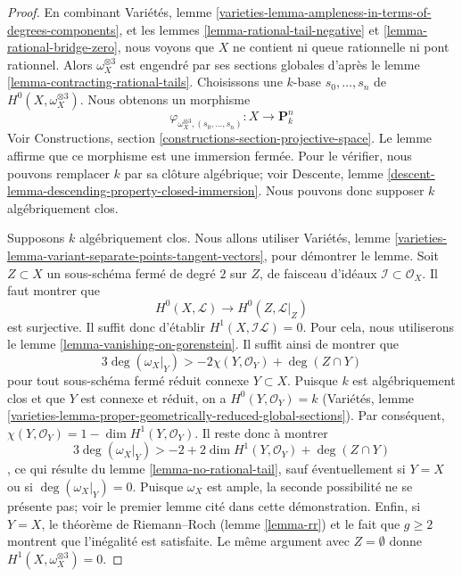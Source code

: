 \begin{proof}
En combinant Variétés, lemme \ref{varieties-lemma-ampleness-in-terms-of-degrees-components}, et les lemmes \ref{lemma-rational-tail-negative} et \ref{lemma-rational-bridge-zero}, nous voyons que $X$ ne contient ni queue rationnelle ni pont rationnel. Alors $\omega_X^{\otimes 3}$ est engendré par ses sections globales d'après le lemme \ref{lemma-contracting-rational-tails}. Choisissons une $k$-base $s_0, \ldots, s_n$ de $H^0(X, \omega_X^{\otimes 3})$. Nous obtenons un morphisme $$
\varphi_{\omega_X^{\otimes 3}, (s_0, \ldots, s_n)} :
X \longrightarrow \mathbf{P}^n_k
$$ Voir Constructions, section \ref{constructions-section-projective-space}. Le lemme affirme que ce morphisme est une immersion fermée. Pour le vérifier, nous pouvons remplacer $k$ par sa clôture algébrique; voir Descente, lemme \ref{descent-lemma-descending-property-closed-immersion}. Nous pouvons donc supposer $k$ algébriquement clos.

\medskip\noindent
Supposons $k$ algébriquement clos. Nous allons utiliser Variétés, lemme \ref{varieties-lemma-variant-separate-points-tangent-vectors}, pour démontrer le lemme. Soit $Z \subset X$ un sous-schéma fermé de degré $2$ sur $Z$, de faisceau d'idéaux $\mathcal{I} \subset \mathcal{O}_X$. Il faut montrer que $$
H^0(X, \mathcal{L}) \to H^0(Z, \mathcal{L}|_Z)
$$ est surjective. Il suffit donc d'établir $H^1(X, \mathcal{I}\mathcal{L}) = 0$. Pour cela, nous utiliserons le lemme \ref{lemma-vanishing-on-gorenstein}. Il suffit ainsi de montrer que $$
3\deg(\omega_X|_Y) > -2\chi(Y, \mathcal{O}_Y) + \deg(Z \cap Y)
$$ pour tout sous-schéma fermé réduit connexe $Y \subset X$. Puisque $k$ est algébriquement clos et que $Y$ est connexe et réduit, on a $H^0(Y, \mathcal{O}_Y) = k$ (Variétés, lemme \ref{varieties-lemma-proper-geometrically-reduced-global-sections}). Par conséquent, $\chi(Y, \mathcal{O}_Y) = 1 - \dim H^1(Y, \mathcal{O}_Y)$. Il reste donc à montrer $$
3\deg(\omega_X|_Y) > -2 + 2\dim H^1(Y, \mathcal{O}_Y) + \deg(Z \cap Y)
$$, ce qui résulte du lemme \ref{lemma-no-rational-tail}, sauf éventuellement si $Y = X$ ou si $\deg(\omega_X|_Y) = 0$. Puisque $\omega_X$ est ample, la seconde possibilité ne se présente pas; voir le premier lemme cité dans cette démonstration. Enfin, si $Y = X$, le théorème de Riemann--Roch (lemme \ref{lemma-rr}) et le fait que $g \geq 2$ montrent que l'inégalité est satisfaite. Le même argument avec $Z = \emptyset$ donne $H^1(X, \omega_X^{\otimes 3}) = 0$.
\end{proof}







